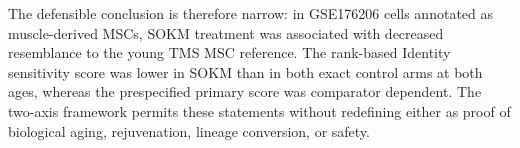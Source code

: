 \documentclass[10pt,twocolumn]{article}
\newcommand{\SOKM}{SOKM}
\begin{document}
The defensible conclusion is therefore narrow: in GSE176206 cells annotated as muscle-derived MSCs, \SOKM{} treatment was associated with decreased resemblance to the young TMS MSC reference. The rank-based Identity sensitivity score was lower in \SOKM{} than in both exact control arms at both ages, whereas the prespecified primary score was comparator dependent. The two-axis framework permits these statements without redefining either as proof of biological aging, rejuvenation, lineage conversion, or safety.




\end{document}
